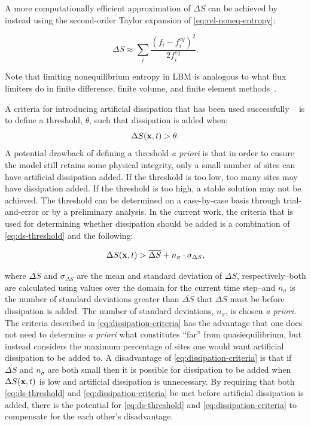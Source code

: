 \noindent A more computationally efficient approximation of $\Delta S$ can be achieved by instead using the second-order Taylor expansion of \eqref{eq:rel-noneq-entropy}:

\begin{equation} \label{eq:quadratic-entropy}
\Delta S \approx \sum_i \frac{(f_i - f^{eq}_i)^2}{2f^{eq}_i}.
\end{equation}

\noindent Note that limiting nonequilibrium entropy in LBM is analogous to what flux limiters do in finite difference, finite volume, and finite element methods~\cite{brownlee2008nonequilibrium}.

A criteria for introducing artificial dissipation that has been used successfully ~\cite{gorban2014enhancement,brownlee2006stabilization,brownlee2007stability,brownlee2008nonequilibrium} is to define a threshold, $\theta$, such that dissipation is added when:
\begin{equation} \label{eq:ds-threshold}
  \Delta S(\mathbf{x}, t) > \theta.
\end{equation}
A potential drawback of defining a threshold \textit{a priori} is that in order to ensure the model still retains some physical integrity, only a small number of sites can have artificial dissipation added.
If the threshold is too low, too many sites may have dissipation added.
If the threshold is too high, a stable solution may not be achieved.
The threshold can be determined on a case-by-case basis through trial-and-error or by a preliminary analysis.
In the current work, the criteria that is used for determining whether dissipation should be added is a combination of \eqref{eq:ds-threshold} and the following:

\begin{equation} \label{eq:dissipation-criteria}
  \Delta S(\mathbf{x}, t) > \overline{\Delta S} + n_\sigma \cdot \sigma_{\Delta S},
\end{equation}

\noindent where $\overline{\Delta S}$ and $\sigma_{\Delta S}$ are the mean and standard deviation of $\Delta S$, respectively--both are calculated using values over the domain for the current time step--and $n_\sigma$ is the number of standard deviations greater than $\overline{\Delta S}$ that $\Delta S$ must be before dissipation is added.
The number of standard deviations, $n_\sigma$, is chosen \textit{a priori}.
The criteria described in \eqref{eq:dissipation-criteria} has the advantage that one does not need to determine \textit{a priori} what constitutes ``far'' from quasiequilibrium, but instead considers the maximum percentage of sites one would want artificial dissipation to be added to.
A disadvantage of \eqref{eq:dissipation-criteria} is that if $\overline{\Delta S}$ and $n_\sigma$ are both small then it is possible for dissipation to be added when $\Delta S(\mathbf{x}, t)$ is low and artificial dissipation is unnecessary.
By requiring that both \eqref{eq:ds-threshold} and \eqref{eq:dissipation-criteria} be met before artificial dissipation is added, there is the potential for \eqref{eq:ds-threshold} and \eqref{eq:dissipation-criteria} to compensate for the each other's disadvantage.

